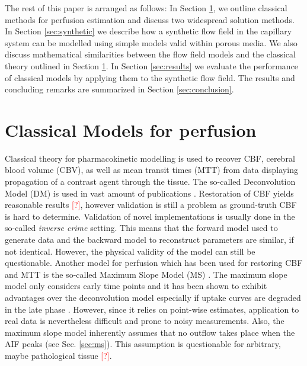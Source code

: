 \documentclass[paper=a4, fontsize=11pt,parskip=half,headings=small]{scrartcl}
\newcommand{\missingsource}{\textcolor{red}{[?]}}
\begin{document}
	The rest of this paper is arranged as follows: In Section \ref{sec:classical}, we outline classical methods for perfusion estimation and discuss two widespread solution methods. 
	In Section \ref{sec:synthetic} we describe how a synthetic flow field in the capillary system can be modelled using simple models valid within porous media. 
	We also discuss mathematical similarities between the flow field models and the classical theory outlined in Section \ref{sec:classical}. 
	In Section \ref{sec:results} we evaluate the performance of classical models by applying them to the synthetic flow field. 
	The results and concluding remarks are summarized in Section \ref{sec:conclusion}.
	
	
	
	\section{Classical Models for perfusion} \label{sec:classical}

	Classical theory for pharmacokinetic modelling is used to recover CBF, cerebral blood volume (CBV), as well as mean transit times (MTT) from data displaying propagation of a contrast agent through the tissue.
	The so-called Deconvolution Model (DM) is used in vast amount of publications \cite{ostergaard96,abels10,straka10,bivard13,sourbron13}.
	Restoration of CBF yields reasonable results \missingsource, however validation is still a problem as ground-truth CBF is hard to determine.
	Validation of novel implementations is usually done in the so-called \emph{inverse crime} setting. 
	This means that the forward model used to generate data and the backward model to reconstruct parameters are similar, if not identical. However, the physical validity of the model can still be questionable.
	Another model for perfusion which has been used for restoring CBF and MTT is the so-called Maximum Slope Model (MS) \cite{miles91,klotz99}.
	The maximum slope model only considers early time points and it has been shown to exhibit advantages over the deconvolution model especially if uptake curves are degraded in the late phase \cite{abels10}.
	However, since it relies on point-wise estimates, application to real data is nevertheless difficult and prone to noisy measurements.
	Also, the maximum slope model inherently assumes that no outflow takes place when the AIF peaks (see Sec. \ref{sec:ms}).
	This assumption is questionable for arbitrary, maybe pathological tissue \missingsource.
	
\end{document}
